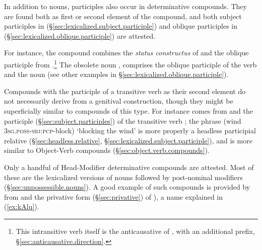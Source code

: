 In addition to nouns, participles also occur in determinative compounds. They are found both as first or second element of the compound, and both subject participles in  (§\ref{sec:lexicalized.subject.participle}) and oblique participles in  (§\ref{sec:lexicalized.oblique.participle}) are attested.

For instance, the compound  combines the \textit{status constructus} of  and the oblique participle  from .\footnote{This intransitive verb itself is the anticausative of , with an additional  prefix, §\ref{sec:anticausative.direction}. } The obsolete noun , comprises the oblique participle  of the verb  and the noun  (see other examples in §\ref{sec:lexicalized.oblique.participle}).

Compounds with the participle of a transitive verb as their second element do not necessarily derive from a genitival construction, though they might be superficially similar to compounds of this type. For instance  comes from  and the participle  (§\ref{sec:subject.participles}) of the transitive verb ; the phrase  (wind \textsc{3sg}.\textsc{poss}-\textsc{sbj}:\textsc{pcp}-block) `blocking the wind' is more properly a headless participial relative (§\ref{sec:headless.relative}, §\ref{sec:lexicalized.subject.participle}), and is more similar to Object-Verb compounds (§\ref{sec:object.verb.compounds}).

Only a handful of Head-Modifier determinative compounds are attested. Most of these are the lexicalized versions of nouns followed by post-nominal modifiers (§\ref{sec:unpossessible.nouns}). A good example of such compounds is provided by  from  and the privative form  (§\ref{sec:privative}) of ), a name explained in (\ref{ex:kAlu}). 

